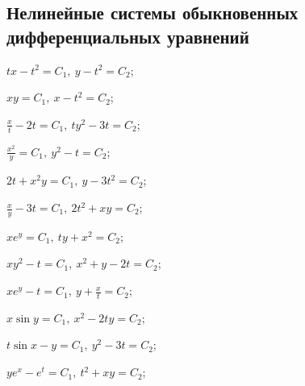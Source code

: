 \subsection*{Нелинейные системы обыкновенных дифференциальных уравнений}
	
	\begin{enumsols}

		\item \( tx - t^2 = C_1, ~ y - t^2 = C_2 \); \sfill %
		\item \( xy = C_1, ~ x - t^2 = C_2 \); \sfill %
		\item \( \frac{x}{t} - 2t = C_1, ~ ty^2 - 3t = C_2 \); \sfill %
		\item \( \frac{x^2}{y} = C_1, ~ y^2 - t = C_2 \); \sfill %
		\item \( 2t + x^2 y = C_1, ~ y - 3t^2 = C_2 \); \sfill %
		\item \( \frac{x}{y} - 3t = C_1, ~ 2 t^2 + xy = C_2 \); \sfill %
		\item \( x e^y = C_1, ~ ty + x^2 = C_2 \); \sfill %
		\item \( x y^2 - t = C_1, ~ x^2 + y - 2t = C_2 \); \sfill %
		
		\label{sol:nonlinsys_systodes:systems2_hard}
		\item \( x e^y - t = C_1, ~ y + \frac{x}{t} = C_2 \); \sfill %
		\item \( x \sin{y} = C_1, ~ x^2 - 2ty = C_2 \); \sfill %
		\item \( t \sin{x} - y = C_1, ~ y^2 - 3t = C_2 \); \sfill %
		\item \( y e^x - e^t = C_1, ~ t^2 + xy = C_2 \); \sfill %


\end{enumsols}
